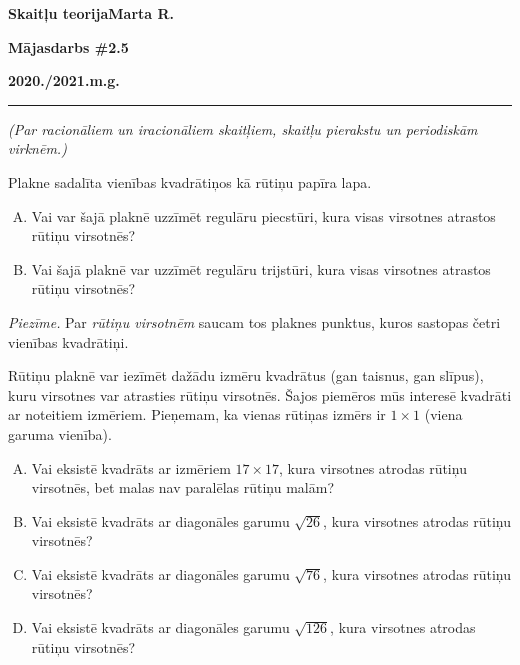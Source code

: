 \documentclass[a4paper,12pt]{article}
\begin{document}
\begin{center}
\parbox{3.5cm}{\flushleft\bf Skaitļu teorija\linebreak Marta R.} \hfill {\bf\LARGE Mājasdarbs \#2.5} \hfill \parbox{3.5cm}{\flushright\bf 2020./2021.m.g.} %
\end{center}

\hrule


\vspace{5pt}
{\em (Par racionāliem un iracionāliem skaitļiem, skaitļu pierakstu un periodiskām virknēm.)}


\vspace{10pt}
\begin{problem}
Plakne sadalīta vienības kvadrātiņos kā rūtiņu papīra lapa. 
\begin{enumerate}[(A)]
\item Vai var šajā plaknē uzzīmēt regulāru piecstūri, kura visas virsotnes atrastos rūtiņu virsotnēs?
\item Vai šajā plaknē var uzzīmēt regulāru trijstūri, kura visas virsotnes atrastos rūtiņu virsotnēs?
\end{enumerate}
{\em Piezīme.} Par {\em rūtiņu virsotnēm} saucam tos plaknes punktus, kuros sastopas četri vienības kvadrātiņi.
\end{problem}


\vspace{10pt}
\begin{problem} 
Rūtiņu plaknē var iezīmēt dažādu izmēru kvadrātus (gan taisnus, gan slīpus), kuru virsotnes var atrasties rūtiņu 
virsotnēs. Šajos piemēros mūs interesē kvadrāti ar noteitiem izmēriem. Pieņemam, ka vienas rūtiņas izmērs ir $1 \times 1$
(viena garuma vienība). 
\begin{enumerate}[(A)]
\item
Vai eksistē kvadrāts ar izmēriem $17 \times 17$, kura virsotnes atrodas rūtiņu virsotnēs, bet malas nav paralēlas rūtiņu malām?
\item 
Vai eksistē kvadrāts ar diagonāles garumu $\sqrt{26}$, kura virsotnes atrodas rūtiņu virsotnēs?
\item 
Vai eksistē kvadrāts ar diagonāles garumu $\sqrt{76}$, kura virsotnes atrodas rūtiņu virsotnēs?
\item 
Vai eksistē kvadrāts ar diagonāles garumu $\sqrt{126}$, kura virsotnes atrodas rūtiņu virsotnēs?
\end{enumerate}
\end{problem}
\end{document}
